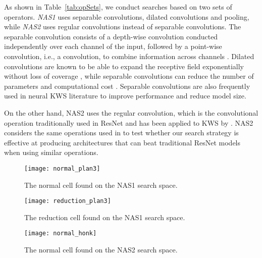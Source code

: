 \documentclass[a4paper]{article}
\begin{document}
As shown in Table~\ref{tab:opSets}, we conduct searches based on two sets of operators. \textit{NAS1} uses separable convolutions, dilated convolutions and pooling, while \textit{NAS2} uses regular convolutions instead of separable convolutions. 
The separable convolution consists of a depth-wise convolution conducted independently over each channel of the input, followed by a point-wise convolution, i.e., a  convolution, to combine information across channels \cite{chollet2017xception,chen2018encoder}. 
Dilated convolutions are known to be able to expand the receptive field exponentially without loss of coverage \cite{yu2015multi}, while separable convolutions can reduce the number of parameters and computational cost \cite{kaiser2017depthwise}.  
Separable convolutions are also frequently used in neural KWS literature \cite{mittermaier2019small,majumdar2020matchboxnet} to improve performance and reduce model size.


On the other hand, NAS2 uses the regular convolution, which is the convolutional operation traditionally used in ResNet and has been applied to KWS by \cite{tang2018deep}.
NAS2 considers the same operations used in \cite{tang2018deep} to test whether our search strategy is effective at producing architectures that can beat traditional ResNet models \cite{tang2018deep} when using similar operations. 






\begin{figure}[!t]
    \centering
    \texttt{[image: normal\_plan3]}
    \vspace{-6.5mm}
    \caption{The normal cell found on the NAS1 search space.}
    \label{fig:normal_plan3}
\end{figure}

\begin{figure}[!t]
    \centering
    \texttt{[image: reduction\_plan3]}
    \vspace{-6.5mm}
    \caption{The reduction cell found on the NAS1 search space.}
    \label{fig:reduction_plan3}
\end{figure}



\begin{figure}[!t]
    \centering
    \texttt{[image: normal\_honk]}
    \vspace{-6.5mm}
    \caption{The normal cell found on the NAS2 search space.}
    \label{fig:normal_honk}
\end{figure}
\end{document}
